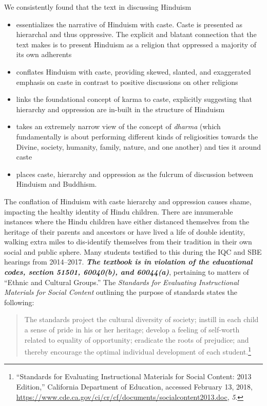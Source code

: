 We consistently found that the text in discussing Hinduism
\begin{itemize} 
\item essentializes the narrative of Hinduism with caste. Caste is presented as hierarchal  and thus oppressive. The explicit and blatant connection that the text makes is to present Hinduism as a religion that oppressed a majority of its own adherents 
\item conflates Hinduism with caste, providing skewed, slanted, and exaggerated emphasis on caste in contrast to positive discussions on other religions
\item links the foundational concept of karma to caste, explicitly suggesting that hierarchy and oppression are in-built in the structure of Hinduism
\item takes an extremely narrow view of the concept of \textit{dharma} (which fundamentally is about performing different kinds of religiosities towards the Divine, society, humanity, family, nature, and one another) and ties it around caste
\item places caste, hierarchy and oppression as the fulcrum of discussion between Hinduism and Buddhism.
\end{itemize}
The conflation of Hinduism with caste hierarchy and oppression causes shame, impacting the healthy identity of Hindu children. There are innumerable instances where the Hindu children have either distanced themselves from the heritage of their parents and ancestors or have lived a life of double identity, walking extra miles to dis-identify themselves from their tradition in their own social and public sphere. Many students testified to this during the IQC and SBE hearings from 2014--2017. \textit{\textbf{The textbook is in violation of the educational codes, section 51501, 60040(b), and 60044(a)}}, pertaining to matters of “Ethnic and Cultural Groups.” The \textit{Standards for Evaluating Instructional Materials for Social Content} outlining the purpose of standards states the following: 
\begin{quote}
The standards project the cultural diversity of society; instill in each child a sense of pride in his or her heritage; develop a feeling of self-worth related to equality of opportunity; eradicate the roots of prejudice; and thereby encourage the optimal individual development of each student.\footnote{“Standards for Evaluating Instructional Materials for Social Content: 2013 Edition,” California Department of Education, accessed February 13, 2018, \url{https://www.cde.ca.gov/ci/cr/cf/documents/socialcontent2013.doc}, \textit{5}.}
\end{quote}
